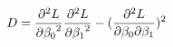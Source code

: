 \documentclass[preview]{standalone}
\begin{document}
\begin{align*}
\special{dvisvgm:raw <g id='unique000'>}D=\frac{\partial^2 L}{\partial {\beta_0}^2}\frac{\partial^2 L}{\partial {\beta_1}^2}-(\frac{\partial^2 L}{\partial \beta_0 \partial \beta_1})^2\special{dvisvgm:raw </g>}
\end{align*}
\end{document}
